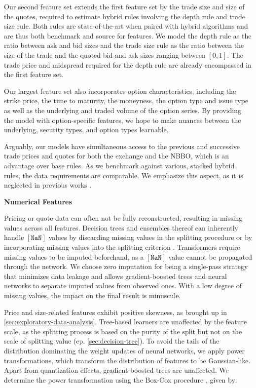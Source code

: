 Our second feature set extends the first feature set by the trade size and size of the quotes, required to estimate hybrid rules involving the depth rule and trade size rule. Both rules are state-of-the-art when paired with hybrid algorithms and are thus both benchmark and source for features. We model the depth rule as the ratio between ask and bid sizes and the trade size rule as the ratio between the size of the trade and the quoted bid and ask sizes ranging between $\left[0,1\right]$. The trade price and midspread required for the depth rule are already encompassed in the first feature set.

Our largest feature set also incorporates option characteristics, including the strike price, the time to maturity, the moneyness, the option type and issue type as well as the underlying and traded volume of the option series. By providing the model with option-specific features, we hope to make nuances between the underlying, security types, and option types learnable.

Arguably, our models have simultaneous access to the previous and successive trade prices and quotes for both the exchange and the NBBO, which is an advantage over base rules. As we benchmark against various, stacked hybrid rules, the data requirements are comparable. We emphasize this aspect, as it is neglected in previous works \autocites[][485]{blazejewskiLocalNonParametricModel2005}[][48]{ronenMachineLearningTrade2022}[][9]{rosenthalModelingTradeDirection2012}.

\textbf{Numerical Features}

Pricing or quote data can often not be fully reconstructed, resulting in missing values across all features. Decision trees and ensembles thereof can inherently handle $\mathtt{[NaN]}$ values by discarding missing values in the splitting procedure \autocite[][150--152]{breimanClassificationRegressionTrees2017} or by incorporating missing values into the splitting criterion \autocite[][951]{twalaGoodMethodsCoping2008}. Transformers require missing values to be imputed beforehand, as a $\mathtt{[NaN]}$ value cannot be propagated through the network. We choose zero imputation for being a single-pass strategy that minimizes data leakage and allows gradient-boosted trees and neural networks to separate imputed values from observed ones. With a low degree of missing values, the impact on the final result is minuscule.

Price and size-related features exhibit positive skewness, as brought up in \cref{sec:exploratory-data-analysis}. Tree-based learners are unaffected by the feature scale, as the splitting process is based on the purity of the split but not on the scale of splitting value (cp. \cref{sec:decision-tree}). To avoid the tails of the distribution dominating the weight updates of neural networks, we apply power transformations, which transform the distribution of features to be Gaussian-like. Apart from quantization effects, gradient-boosted trees are unaffected. We determine the power transformation using the Box-Cox procedure \autocite[][214]{boxAnalysisTransformations2022}, given by:

